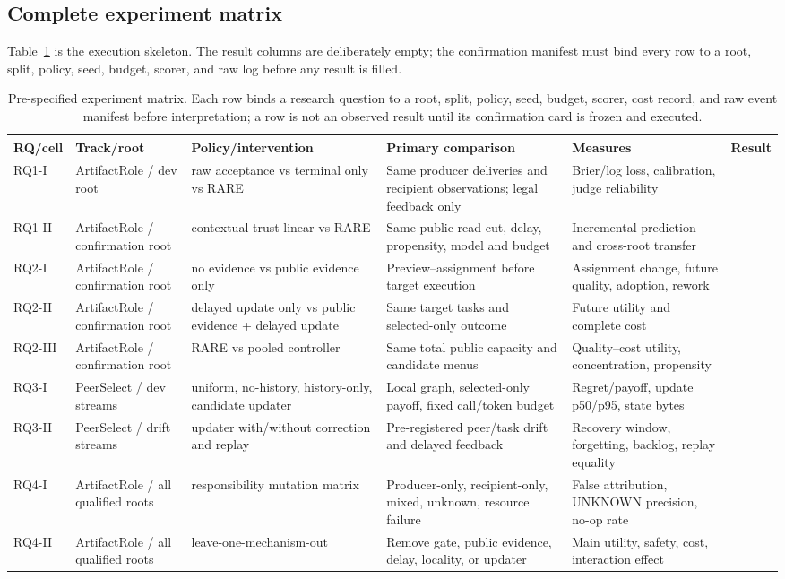 \documentclass[sigconf,anonymous]{aamas}
\newcommand{\blank}{\textemdash}
\begin{document}
\subsection{Complete experiment matrix}
Table~\ref{tab:matrix} is the execution skeleton. The result columns are deliberately empty; the confirmation manifest must bind every row to a root, split, policy, seed, budget, scorer, and raw log before any result is filled.
\begin{table}[t]
\centering\scriptsize
\begin{tabular}{p{}p{}p{}p{}p{}p{}}
\toprule
RQ/cell & Track/root & Policy/intervention & Primary comparison & Measures & Result\\
\midrule
RQ1-I & ArtifactRole / dev root & raw acceptance vs terminal only vs RARE & Same producer deliveries and recipient observations; legal feedback only & Brier/log loss, calibration, judge reliability & \blank\\
RQ1-II & ArtifactRole / confirmation root & contextual trust linear vs RARE & Same public read cut, delay, propensity, model and budget & Incremental prediction and cross-root transfer & \blank\\
RQ2-I & ArtifactRole / confirmation root & no evidence vs public evidence only & Preview--assignment before target execution & Assignment change, future quality, adoption, rework & \blank\\
RQ2-II & ArtifactRole / confirmation root & delayed update only vs public evidence + delayed update & Same target tasks and selected-only outcome & Future utility and complete cost & \blank\\
RQ2-III & ArtifactRole / confirmation root & RARE vs pooled controller & Same total public capacity and candidate menus & Quality--cost utility, concentration, propensity & \blank\\
RQ3-I & PeerSelect / dev streams & uniform, no-history, history-only, candidate updater & Local graph, selected-only payoff, fixed call/token budget & Regret/payoff, update p50/p95, state bytes & \blank\\
RQ3-II & PeerSelect / drift streams & updater with/without correction and replay & Pre-registered peer/task drift and delayed feedback & Recovery window, forgetting, backlog, replay equality & \blank\\
RQ4-I & ArtifactRole / all qualified roots & responsibility mutation matrix & Producer-only, recipient-only, mixed, unknown, resource failure & False attribution, UNKNOWN precision, no-op rate & \blank\\
RQ4-II & ArtifactRole / all qualified roots & leave-one-mechanism-out & Remove gate, public evidence, delay, locality, or updater & Main utility, safety, cost, interaction effect & \blank\\
\bottomrule
\end{tabular}
\caption{Pre-specified experiment matrix. Each row binds a research question to a root, split, policy, seed, budget, scorer, cost record, and raw event manifest before interpretation; a row is not an observed result until its confirmation card is frozen and executed.}
\label{tab:matrix}
\end{table}
\end{document}
